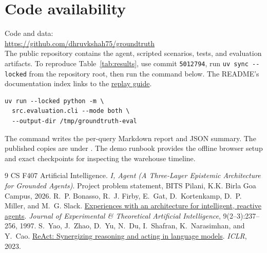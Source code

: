 \documentclass[11pt,a4paper,twocolumn]{article}
\newcommand{\githuburl}{https://github.com/dhruvkshah75/groundtruth}
\begin{document}
\section*{Code availability}
\noindent Code and data:\\
\url{\githuburl}\\
The public repository contains the agent, scripted scenarios, tests,
and evaluation artifacts. To reproduce Table~\ref{tab:results}, use
commit \texttt{5012794}, run \verb|uv sync --locked| from the repository
root, then run the command below. The README's documentation index
links to the \href{https://github.com/dhruvkshah75/groundtruth/blob/50127947154341efce02b63e7e859074764ea1fe/docs/phase-two/Replay_and_Evaluation.md}{replay guide}.

\begin{verbatim}
uv run --locked python -m \
  src.evaluation.cli --mode both \
  --output-dir /tmp/groundtruth-eval
\end{verbatim}

The command writes the per-query Markdown report and JSON summary.
The published copies are under . The
demo runbook provides the offline browser setup and exact checkpoints
for inspecting the warehouse timeline.

\begin{thebibliography}{9}
\small
{}
CS F407 Artificial Intelligence.
\newblock \emph{I, Agent (A Three-Layer Epistemic Architecture for Grounded Agents)}.
\newblock Project problem statement, BITS Pilani, K.K. Birla Goa Campus, 2026.
\bibitem{bonasso1997}
R.~P. Bonasso, R.~J. Firby, E.~Gat, D.~Kortenkamp, D.~P. Miller, and M.~G. Slack.
\newblock \href{https://doi.org/10.1080/095281397147103}{Experiences with an architecture for intelligent, reactive agents}.
\newblock \emph{Journal of Experimental \& Theoretical Artificial Intelligence}, 9(2--3):237--256, 1997.
\bibitem{yao2023}
S.~Yao, J.~Zhao, D.~Yu, N.~Du, I.~Shafran, K.~Narasimhan, and Y.~Cao.
\newblock \href{https://arxiv.org/abs/2210.03629}{ReAct: Synergizing reasoning and acting in language models}.
\newblock \emph{ICLR}, 2023.
\end{thebibliography}
\end{document}

